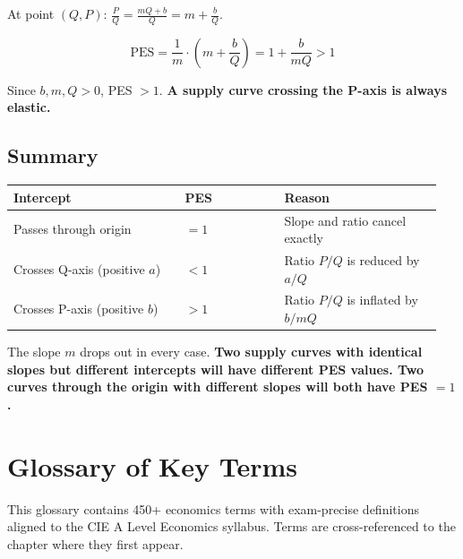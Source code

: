 \documentclass[11pt, a4paper, twoside]{book}
\begin{document}
At point $(Q, P)$: $\frac{P}{Q} = \frac{mQ + b}{Q} = m + \frac{b}{Q}$.

\[
\text{PES} = \frac{1}{m} \cdot \left(m + \frac{b}{Q}\right) = 1 + \frac{b}{mQ} > 1
\]

Since $b, m, Q > 0$, PES $> 1$. \textbf{A supply curve crossing the P-axis is always elastic.}

\section*{Summary}

\begin{tcolorbox}[enhanced,colback=FillPrimary!30,colframe=AxisCharcoal!70,arc=0pt,boxrule=0.8pt,
  left=8pt,right=8pt,top=6pt,bottom=6pt]
\begin{tabular}{@{}>{\RaggedRight\arraybackslash}p{0.38\linewidth}>{\RaggedRight\arraybackslash}p{0.22\linewidth}>{\RaggedRight\arraybackslash}p{0.35\linewidth}@{}}
\textbf{\color{CurveNavy}Intercept} & \textbf{\color{CurveNavy}PES} & \textbf{\color{CurveNavy}Reason} \\
\midrule
Passes through origin & $= 1$ & Slope and ratio cancel exactly \\
Crosses Q-axis (positive $a$) & $< 1$ & Ratio $P/Q$ is reduced by $a/Q$ \\
Crosses P-axis (positive $b$) & $> 1$ & Ratio $P/Q$ is inflated by $b/mQ$ \\
\end{tabular}
\end{tcolorbox}

The slope $m$ drops out in every case. \textbf{Two supply curves with identical slopes but different intercepts will have different PES values. Two curves through the origin with different slopes will both have PES $= 1$.}

\clearpage
\pagestyle{fancy}
\chapter*{Glossary of Key Terms}

{\small This glossary contains 450+ economics terms with exam-precise definitions aligned to the CIE A Level Economics syllabus. Terms are cross-referenced to the chapter where they first appear.}

\vspace{6pt}
\end{document}
